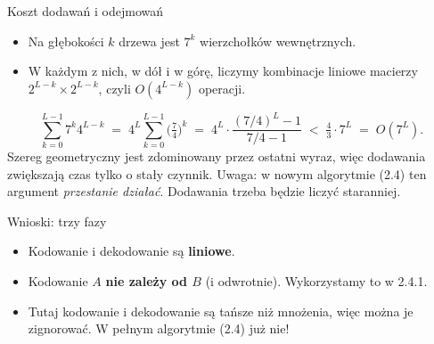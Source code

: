 \begin{frame}{Koszt dodawań i odejmowań}
  \begin{itemize}
    \item Na głębokości $k$ drzewa jest $7^k$ wierzchołków wewnętrznych.
    \item W każdym z nich, w dół i w górę, liczymy kombinacje liniowe macierzy
      $2^{L-k}\times2^{L-k}$, czyli $O(4^{L-k})$ operacji.
  \end{itemize}
  \pause
  \[
    \sum_{k=0}^{L-1}7^k4^{L-k}
    \;=\;4^L\sum_{k=0}^{L-1}\Big(\tfrac74\Big)^k
    \;=\;4^L\cdot\frac{(7/4)^L-1}{7/4-1}
    \;<\;\tfrac43\cdot7^L
    \;=\;O(7^L).
  \]
  \pause
  Szereg geometryczny jest zdominowany przez ostatni wyraz, więc dodawania zwiększają czas tylko o stały czynnik.
  \pause
  \alert{Uwaga:} w nowym algorytmie (2.4) ten argument \emph{przestanie działać}. Dodawania trzeba
  będzie liczyć staranniej.
\end{frame}

\begin{frame}{Wnioski: trzy fazy}
  \centering
  \vspace{0.5em}
  \begin{itemize}
    \item<2-> Kodowanie i dekodowanie są \textbf{liniowe}.
    \item<3-> Kodowanie $A$ \textbf{nie zależy od $B$} (i odwrotnie). Wykorzystamy to w 2.4.1.
    \item<4-> Tutaj kodowanie i dekodowanie są tańsze niż mnożenia, więc można je zignorować.
      \alert{W pełnym algorytmie (2.4) już nie!}
  \end{itemize}
\end{frame}

